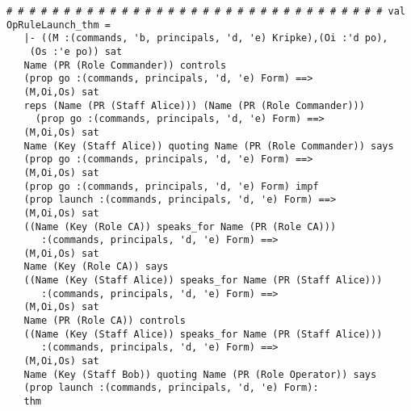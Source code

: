 \documentclass{report}
\begin{document}
\begin{session}
  \begin{scriptsize}
\begin{verbatim}
# # # # # # # # # # # # # # # # # # # # # # # # # # # # # # # # # val OpRuleLaunch_thm =
   |- ((M :(commands, 'b, principals, 'd, 'e) Kripke),(Oi :'d po),
    (Os :'e po)) sat
   Name (PR (Role Commander)) controls
   (prop go :(commands, principals, 'd, 'e) Form) ==>
   (M,Oi,Os) sat
   reps (Name (PR (Staff Alice))) (Name (PR (Role Commander)))
     (prop go :(commands, principals, 'd, 'e) Form) ==>
   (M,Oi,Os) sat
   Name (Key (Staff Alice)) quoting Name (PR (Role Commander)) says
   (prop go :(commands, principals, 'd, 'e) Form) ==>
   (M,Oi,Os) sat
   (prop go :(commands, principals, 'd, 'e) Form) impf
   (prop launch :(commands, principals, 'd, 'e) Form) ==>
   (M,Oi,Os) sat
   ((Name (Key (Role CA)) speaks_for Name (PR (Role CA)))
      :(commands, principals, 'd, 'e) Form) ==>
   (M,Oi,Os) sat
   Name (Key (Role CA)) says
   ((Name (Key (Staff Alice)) speaks_for Name (PR (Staff Alice)))
      :(commands, principals, 'd, 'e) Form) ==>
   (M,Oi,Os) sat
   Name (PR (Role CA)) controls
   ((Name (Key (Staff Alice)) speaks_for Name (PR (Staff Alice)))
      :(commands, principals, 'd, 'e) Form) ==>
   (M,Oi,Os) sat
   Name (Key (Staff Bob)) quoting Name (PR (Role Operator)) says
   (prop launch :(commands, principals, 'd, 'e) Form):
   thm
\end{verbatim}
  \end{scriptsize}
\end{session}
\end{document}
